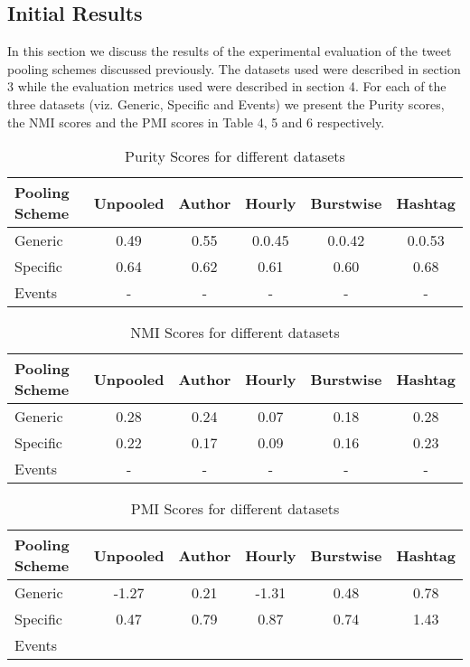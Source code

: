 \documentclass[10pt,a5paper,twoside]{article}
\begin{document}
\subsection{Initial Results}
In this section we discuss the results of the experimental evaluation of the tweet pooling schemes discussed previously. The datasets used were described in section 3 while the evaluation metrics used were described in section 4. For each of the three datasets (viz. Generic, Specific and Events) we present the Purity scores, the NMI scores and the PMI scores in Table 4, 5 and 6 respectively. 
\\
\begin{table}[!h]
\setcounter{table}{4}
\centering
	\begin{tabular}{|l|c|c|c|c|c|}
	\hline
	Pooling Scheme & Unpooled & Author & Hourly & Burstwise & Hashtag\\
	\hline
	Generic & 0.49 & 0.55 & 0.0.45 & 0.0.42 & 0.0.53\\
	\hline
	Specific & 0.64 & 0.62 & 0.61 & 0.60 & 0.68\\
	\hline
	Events & - & - & - & - & - \\
	\hline
	\end{tabular}
\caption{Purity Scores for different datasets}\label{Table}
\end{table}


\begin{table}[!h]
\setcounter{table}{5}
\centering
	\begin{tabular}{|l|c|c|c|c|c|}
	\hline
	Pooling Scheme & Unpooled & Author & Hourly & Burstwise & Hashtag\\
	\hline
	Generic & 0.28 & 0.24 & 0.07 & 0.18 & 0.28\\
	\hline
	Specific & 0.22 & 0.17 & 0.09 & 0.16 & 0.23\\
	\hline
	Events & - & - & - & - & -\\
	\hline
	\end{tabular}\caption{NMI Scores for different datasets}\label{Table}
\end{table}


\begin{table}[!h]
\setcounter{table}{6}
\centering
	\begin{tabular}{|l|c|c|c|c|c|}
	\hline
	Pooling Scheme & Unpooled & Author & Hourly & Burstwise & Hashtag\\
	\hline
	Generic & -1.27 & 0.21 & -1.31 & 0.48 & 0.78\\
	\hline
	Specific & 0.47 & 0.79 & 0.87 & 0.74 & 1.43\\
	\hline
	Events & & & & &\\
	\hline
	\end{tabular}\caption{PMI Scores for different datasets}\label{Table}
\end{table}
\end{document}
